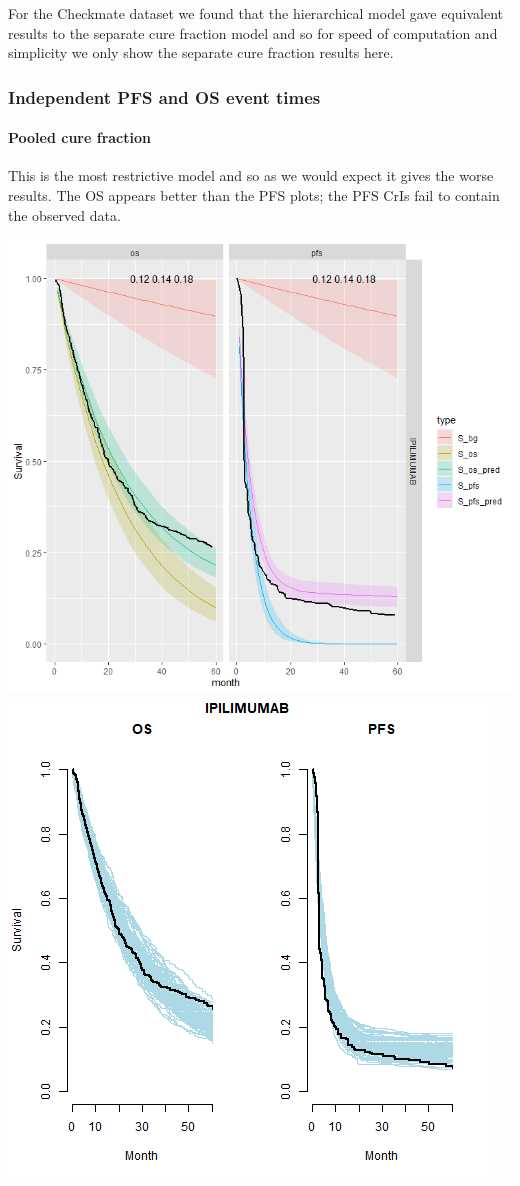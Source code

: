 \documentclass[
]{article}
\begin{document}
For the Checkmate dataset we found that the hierarchical model gave
equivalent results to the separate cure fraction model and so for speed
of computation and simplicity we only show the separate cure fraction
results here.

\hypertarget{independent-pfs-and-os-event-times}{%
\subsubsection{Independent PFS and OS event
times}\label{independent-pfs-and-os-event-times}}

\hypertarget{pooled-cure-fraction}{%
\paragraph{Pooled cure fraction}\label{pooled-cure-fraction}}

This is the most restrictive model and so as we would expect it gives
the worse results. The OS appears better than the PFS plots; the PFS
CrIs fail to contain the observed data.

\begin{center}\includegraphics[width=0.4\linewidth]{../plots/S_plots_exp_exp_cf_pooled_IPI} \includegraphics[width=0.4\linewidth]{../plots/post_pred_cf pooled_exp_exp_IPILIMUMAB} \end{center}
\end{document}
